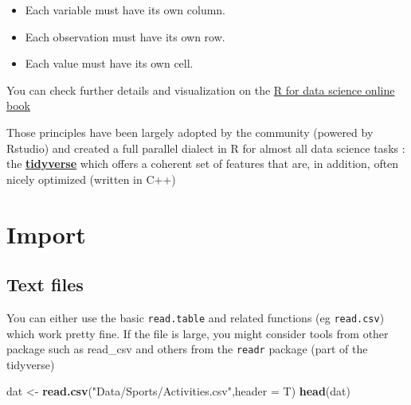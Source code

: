 \documentclass[
]{book}
\newenvironment{Shaded}{\begin{snugshade}}{\end{snugshade}}
\newcommand{\DataTypeTok}[1]{\textcolor[rgb]{0.13,0.29,0.53}{#1}}
\newcommand{\KeywordTok}[1]{\textcolor[rgb]{0.13,0.29,0.53}{\textbf{#1}}}
\newcommand{\NormalTok}[1]{#1}
\newcommand{\StringTok}[1]{\textcolor[rgb]{0.31,0.60,0.02}{#1}}
\providecommand{\tightlist}{%
  \setlength{\itemsep}{0pt}\setlength{\parskip}{0pt}}
\begin{document}
\begin{itemize}
\tightlist
\item
  Each variable must have its own column.
\item
  Each observation must have its own row.
\item
  Each value must have its own cell.
\end{itemize}

You can check further details and visualization on the \href{https://r4ds.had.co.nz/tidy-data.html}{R for data science online book}

Those principles have been largely adopted by the community (powered by Rstudio) and created a full parallel dialect in R for almost all data science tasks : the \href{https://www.tidyverse.org/}{\textbf{tidyverse}} which offers a coherent set of features that are, in addition, often nicely optimized (written in C++)

\hypertarget{import}{%
\section{Import}\label{import}}

\hypertarget{text-files}{%
\subsection{Text files}\label{text-files}}

You can either use the basic \texttt{read.table} and related functions (eg \texttt{read.csv}) which work pretty fine. If the file is large, you might consider tools from other package such as read\_csv and others from the \texttt{readr} package (part of the tidyverse)

\begin{Shaded}
\begin{Highlighting}[]
\NormalTok{dat <-}\StringTok{ }\KeywordTok{read.csv}\NormalTok{(}\StringTok{"Data/Sports/Activities.csv"}\NormalTok{,}\DataTypeTok{header =}\NormalTok{ T)}
\KeywordTok{head}\NormalTok{(dat)}
\end{Highlighting}
\end{Shaded}
\end{document}
